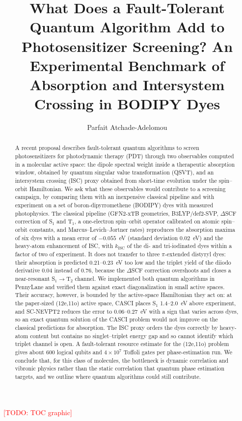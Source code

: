 \documentclass[journal=jpcafh,manuscript=article]{achemso}
\author{Parfait Atchade-Adelomou}
\affiliation[MIT Media Lab]{City Science, MIT Media Lab, Massachusetts Institute of Technology,
  75 Amherst St, Cambridge, MA 02139, USA}
\title[Quantum algorithms for photosensitizer screening: an experimental benchmark]
{What Does a Fault-Tolerant Quantum Algorithm Add to Photosensitizer Screening?
 An Experimental Benchmark of Absorption and Intersystem Crossing in BODIPY Dyes}
\newcommand{\todo}[1]{\textcolor{red}{[TODO: #1]}}
\newcommand{\kisc}{k_\mathrm{ISC}}
\begin{document}
\begin{tocentry}
\todo{TOC graphic}
\end{tocentry}

\begin{abstract}
A recent proposal describes fault-tolerant quantum algorithms to screen photosensitizers for
photodynamic therapy (PDT) through two observables computed in a molecular active space: the
dipole spectral weight inside a therapeutic absorption window, obtained by quantum singular value
transformation (QSVT), and an intersystem crossing (ISC) proxy obtained from short-time evolution
under the spin--orbit Hamiltonian. We ask what these observables would contribute to a screening
campaign, by comparing them with an inexpensive classical pipeline and with experiment on a set of
boron-dipyrromethene (BODIPY) dyes with measured photophysics. The classical pipeline (GFN2-xTB
geometries, B3LYP/def2-SVP, $\Delta$SCF correction of S$_1$ and T$_1$, a one-electron spin--orbit
operator calibrated on atomic spin--orbit constants, and Marcus--Levich--Jortner rates) reproduces
the absorption maxima of six dyes with a mean error of $-0.055$~eV (standard deviation 0.02~eV) and
the heavy-atom enhancement of ISC, with $\kisc$ of the di- and tri-iodinated dyes within a factor of
two of experiment. It does not transfer to three $\pi$-extended distyryl dyes: their absorption is
predicted 0.21--0.23~eV too low and the triplet yield of the diiodo derivative 0.04 instead of
0.76, because the $\Delta$SCF correction overshoots and closes a near-resonant S$_1\to$T$_2$
channel. We implemented both quantum algorithms in PennyLane and verified them against
exact diagonalization in small active spaces. Their accuracy, however, is bounded by the active-space
Hamiltonian they act on: at the paper-sized (12e,11o) active space, CASCI places S$_1$ 1.4--2.0~eV
above experiment, and SC-NEVPT2 reduces the error to 0.06--0.27~eV with a sign that varies across
dyes, so an exact quantum solution of the CASCI problem would not improve on the classical
predictions for absorption. The ISC proxy orders the dyes correctly by heavy-atom content but
contains no singlet--triplet energy gap and so cannot identify which triplet channel is open. A
fault-tolerant resource estimate for the (12e,11o) problem gives about 600 logical qubits and
$4\times10^{7}$ Toffoli gates per phase-estimation run. We conclude that, for this class of
molecules, the bottleneck is dynamic correlation and vibronic physics rather than the static
correlation that quantum phase estimation targets, and we outline where quantum algorithms could
still contribute.
\end{abstract}
\end{document}

